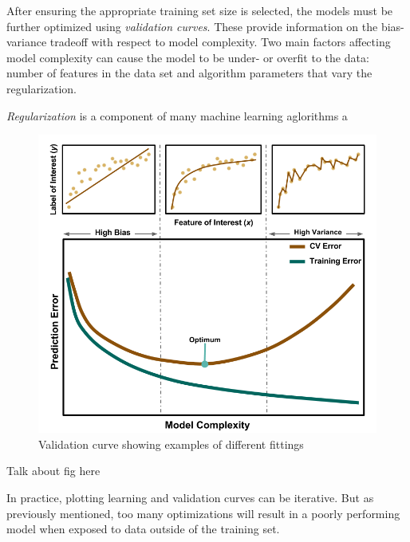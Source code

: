 After ensuring the appropriate training set size is selected, the models must
be further optimized using \textit{validation curves}.  These provide
information on the bias-variance tradeoff with respect to model complexity. Two
main factors affecting model complexity can cause the model to be under- or
overfit to the data: number of features in the data set and algorithm
parameters that vary the regularization.

\textit{Regularization} is a component of many machine learning aglorithms a

\begin{figure}[!htb]
  \centering
  \includegraphics[width=1.05\linewidth]{./chapters/litrev/ValidationCurve.png}
  \caption{Validation curve showing examples of different fittings}
  \label{fig:validation}
\end{figure}

Talk about fig here

In practice, plotting learning and validation curves can be iterative. But as
previously mentioned, too many optimizations will result in a poorly performing
model when exposed to data outside of the training set.

